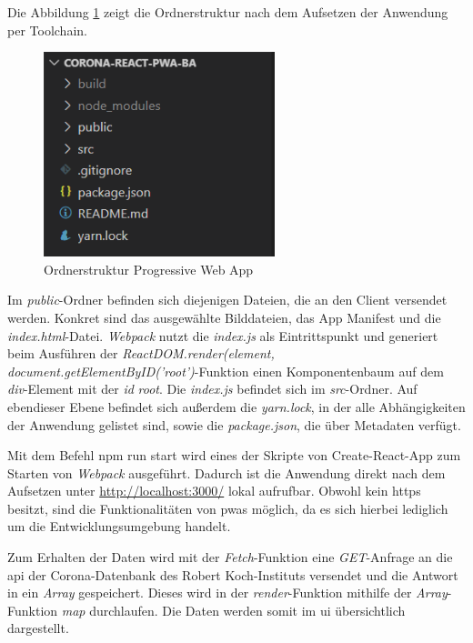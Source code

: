 Die Abbildung \ref{fig:structure_pwa} zeigt die Ordnerstruktur nach dem Aufsetzen der Anwendung per Toolchain.
 
\begin{figure}[h]
 \centering
 \includegraphics[width=0.6\textwidth]{figures/Structure_PWA.png}
 \caption{Ordnerstruktur Progressive Web App}
 \label{fig:structure_pwa}
\end{figure}

Im \textit{public}-Ordner befinden sich diejenigen Dateien, die an den Client versendet werden.
Konkret sind das ausgewählte Bilddateien, das App Manifest und die \textit{index.html}-Datei.
\textit{Webpack} nutzt die \textit{index.js} als Eintrittspunkt und generiert beim Ausführen der \textit{ReactDOM.render(element, document.getElementByID('root')}-Funktion einen Komponentenbaum auf dem \textit{div}-Element mit der \textit{id} \textit{root}.
Die \textit{index.js} befindet sich im \textit{src}-Ordner.
Auf ebendieser Ebene befindet sich außerdem die \textit{yarn.lock}, in der alle Abhängigkeiten der Anwendung gelistet sind, sowie die \textit{package.json}, die über Metadaten verfügt.

Mit dem Befehl \glqq npm run start\grqq{} wird eines der Skripte von Create-React-App zum Starten von \textit{Webpack} ausgeführt.
Dadurch ist die Anwendung direkt nach dem Aufsetzen unter \url{http://localhost:3000/} lokal aufrufbar.
Obwohl  kein \ac{https} besitzt, sind die Funktionalitäten von \acp{pwa} möglich, da es sich hierbei lediglich um die Entwicklungsumgebung handelt.

Zum Erhalten der Daten wird mit der \textit{Fetch}-Funktion eine \textit{GET}-Anfrage an die \ac{api} der Corona-Datenbank des Robert Koch-Instituts versendet und die Antwort in ein \textit{Array} gespeichert.
Dieses wird in der \textit{render}-Funktion mithilfe der \textit{Array}-Funktion \textit{map} durchlaufen.
Die Daten werden somit im \ac{ui} übersichtlich dargestellt.

